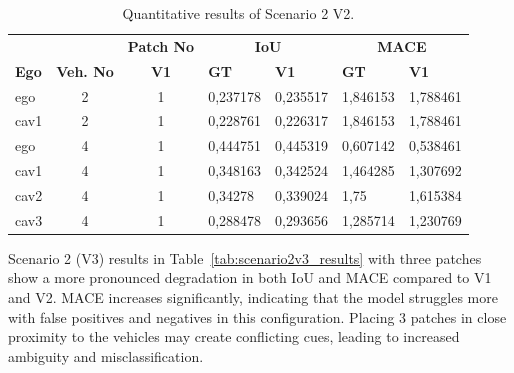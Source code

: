 \begin{table}[H]
    \centering
    \caption{Quantitative results of Scenario 2 V2.}
    \label{tab:scenario2v2_results}
    \begin{tabularx}{\textwidth}{l c c *{4}{X}}
        \toprule
            &             &   \multicolumn{1}{c}{\textbf{Patch No}}  & \multicolumn{2}{c}{\textbf{IoU}} & \multicolumn{2}{c}{\textbf{MACE}}                            \\
        \cmidrule(lr){4-5}\cmidrule(lr){6-7}
        \textbf{Ego}           &
        \textbf{Veh. No}       &
        \textbf{V1}      &
        \textbf{GT}            & \textbf{V1}  &
        \textbf{GT}            & \textbf{V1}  \\
        \midrule %
        ego        & 2  & 1 & 0,237178 & 0,235517 & 1,846153 & 1,788461 \\
        cav1         & 2  & 1 & 0,228761 & 0,226317 & 1,846153 & 1,788461 \\
        \midrule
        ego        & 4  & 1 & 0,444751 & 0,445319 & 0,607142 & 0,538461 \\
        cav1        & 4  & 1 & 0,348163 & 0,342524 & 1,464285 & 1,307692 \\
        cav2        & 4  & 1 & 0,34278 & 0,339024 & 1,75 & 1,615384 \\
        cav3        & 4  & 1 & 0,288478 & 0,293656 & 1,285714 & 1,230769 \\
        \bottomrule
    \end{tabularx}
\end{table}

Scenario 2 (V3) results in Table~\ref{tab:scenario2v3_results} with three patches show a more pronounced degradation in both IoU and MACE compared to V1 and V2.
MACE increases significantly, indicating that the model struggles more with false positives and negatives in this configuration.
Placing 3 patches in close proximity to the vehicles may create conflicting cues, leading to increased ambiguity and misclassification.

